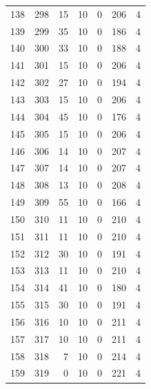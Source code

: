\documentclass[a4paper,twoside,12pt]{book}
\begin{document}
\begin{appendices}
\begin{table}
\begin{tabular}{lrrrrrr}
		138 &    298 &        15 &        10 &               0 &             206 &         4 \\
		139 &    299 &        35 &        10 &               0 &             186 &         4 \\
		140 &    300 &        33 &        10 &               0 &             188 &         4 \\
		141 &    301 &        15 &        10 &               0 &             206 &         4 \\
		142 &    302 &        27 &        10 &               0 &             194 &         4 \\
		143 &    303 &        15 &        10 &               0 &             206 &         4 \\
		144 &    304 &        45 &        10 &               0 &             176 &         4 \\
		145 &    305 &        15 &        10 &               0 &             206 &         4 \\
		146 &    306 &        14 &        10 &               0 &             207 &         4 \\
		147 &    307 &        14 &        10 &               0 &             207 &         4 \\
		148 &    308 &        13 &        10 &               0 &             208 &         4 \\
		149 &    309 &        55 &        10 &               0 &             166 &         4 \\
		150 &    310 &        11 &        10 &               0 &             210 &         4 \\
		151 &    311 &        11 &        10 &               0 &             210 &         4 \\
		152 &    312 &        30 &        10 &               0 &             191 &         4 \\
		153 &    313 &        11 &        10 &               0 &             210 &         4 \\
		154 &    314 &        41 &        10 &               0 &             180 &         4 \\
		155 &    315 &        30 &        10 &               0 &             191 &         4 \\
		156 &    316 &        10 &        10 &               0 &             211 &         4 \\
		157 &    317 &        10 &        10 &               0 &             211 &         4 \\
		158 &    318 &         7 &        10 &               0 &             214 &         4 \\
		159 &    319 &         0 &        10 &               0 &             221 &         4 \\
		\bottomrule
	\end{tabular}		
\end{table}
   

\end{appendices}
\end{document}
